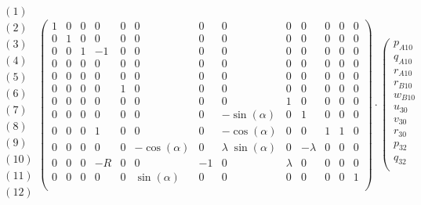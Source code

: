 \documentclass[10pt,fleqn]{article} %
\begin{document}
\begin{multicols}{2}
\begin{multicols}{2}
				\begin{align*}
				\begin{array}{c}
(1)\\
(2)\\
(3)\\
(4)\\
(5)\\
(6)\\
(7)\\
(8)\\
(9)\\
(10)\\
(11)\\
(12)\\
\end{array}
\left(
\begin{array}{ccccccccccccc}
1 & 0 & 0 & 0 & 0 & 0 & 0 & 0 & 0 & 0 & 0 & 0 & 0 \\
0 & 1 & 0 & 0 & 0 & 0 & 0 & 0 & 0 & 0 & 0 & 0 & 0 \\ 
0 & 0 & 1 & -1 & 0 & 0 & 0 & 0 & 0 & 0 & 0 & 0 & 0 \\ 
0 & 0 & 0 & 0 & 0 & 0 & 0 & 0 & 0 & 0 & 0 & 0 & 0 \\ 
0 & 0 & 0 & 0 & 0 & 0 & 0 & 0 & 0 & 0 & 0 & 0 & 0 \\ 
0 & 0 & 0 & 0 & 1 & 0 & 0 & 0 & 0 & 0 & 0 & 0 & 0 \\  
0 & 0 & 0 & 0 & 0 & 0 & 0 & 0 & 1 & 0 & 0 & 0 & 0 \\ 
0 & 0 & 0 & 0 & 0 & 0 & 0 & -\sin(\alpha) & 0 & 1 & 0 & 0 & 0 \\
0 & 0 & 0 & 1 & 0 & 0 & 0 & -\cos(\alpha) & 0 & 0 & 1 & 1 & 0 \\
0 & 0 & 0 & 0 & 0 & -\cos(\alpha) & 0 & \lambda \;\sin(\alpha) & 0 & -\lambda & 0 & 0 & 0 \\ 
0 & 0 & 0 & -R & 0 & 0 & -1 & 0 & \lambda & 0 & 0 & 0 & 0 \\
0 & 0 & 0 & 0 & 0 & \sin(\alpha) & 0 & 0 & 0 & 0 & 0 & 0 & 1 \\ 
\end{array} 
\right)
\cdot 
\left(
\begin{array}{c}
p_{A10}\\
q_{A10}\\
r_{A10}\\
r_{B10}\\
w_{B10}\\
u_{30}\\
v_{30}\\
r_{30}\\
p_{32}\\
q_{32}\\

\end{array}
\end{align*}
\end{multicols}
\end{multicols}
\end{document}
